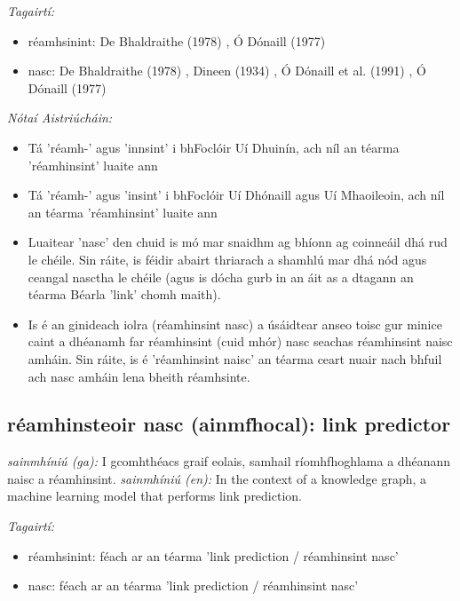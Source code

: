 \documentclass{article}
\begin{document}
 \noindent \textit{Tagairtí:}
\begin{itemize}
	\item réamhsinint: De Bhaldraithe (1978) \cite{de-bhaldraithe}, Ó Dónaill (1977) \cite{odonaill}
	\item nasc: De Bhaldraithe (1978) \cite{de-bhaldraithe}, Dineen (1934) \cite{dineen}, Ó Dónaill et al. (1991) \cite{focloir-beag}, Ó Dónaill (1977) \cite{odonaill}
\end{itemize}

 \noindent \textit{Nótaí Aistriúcháin:}
\begin{itemize}
	\item Tá 'réamh-' agus 'innsint' i bhFoclóir Uí Dhuinín, ach níl an téarma 'réamhinsint' luaite ann
	\item Tá 'réamh-' agus 'insint' i bhFoclóir Uí Dhónaill agus Uí Mhaoileoin, ach níl an téarma 'réamhinsint' luaite ann
	\item Luaitear 'nasc' den chuid is mó mar snaidhm ag bhíonn ag coinneáil dhá rud le chéile. Sin ráite, is féidir abairt thriarach a shamhlú mar dhá nód agus ceangal nasctha le chéile (agus is dócha gurb in an áit as a dtagann an téarma Béarla 'link' chomh maith).
	\item Is é an ginideach iolra (réamhinsint nasc) a úsáidtear anseo toisc gur minice caint a dhéanamh far réamhinsint (cuid mhór) nasc seachas réamhinsint naisc amháin. Sin ráite, is é 'réamhinsint naisc' an téarma ceart nuair nach bhfuil ach nasc amháin lena bheith réamhsinte.
\end{itemize}


\subsection*{réamhinsteoir nasc (ainmfhocal): link predictor} 
 \noindent \textit{sainmhíniú (ga):} I gcomhthéacs graif eolais, samhail ríomhfhoghlama a dhéanann naisc a réamhinsint.
\newline\newline
 \noindent \textit{sainmhíniú (en):} In the context of a knowledge graph, a machine learning model that performs link prediction.
\newline

 \noindent \textit{Tagairtí:}
\begin{itemize}
	\item réamhsinint: féach ar an téarma 'link prediction / réamhinsint nasc'
	\item nasc: féach ar an téarma 'link prediction / réamhinsint nasc'
\end{itemize}
\end{document}
